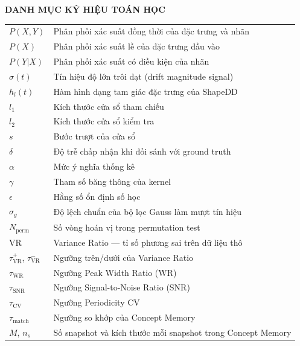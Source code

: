 \newpage
\pagestyle{fancy}

\setcounter{tocdepth}{0}

\begin{center}
    \Large \textbf{DANH MỤC KÝ HIỆU TOÁN HỌC}
\end{center}


\begin{table}[h]
\centering
\fontsize{13pt}{15pt}\selectfont
\begin{tabular}{ll}
$P(X, Y)$               & Phân phối xác suất đồng thời của đặc trưng và nhãn \\
$P(X)$                  & Phân phối xác suất lề của đặc trưng đầu vào        \\
$P(Y|X)$                & Phân phối xác suất có điều kiện của nhãn           \\
$\sigma(t)$             & Tín hiệu độ lớn trôi dạt (drift magnitude signal)  \\
$h_l(t)$                & Hàm hình dạng tam giác đặc trưng của ShapeDD       \\
$l_1$                   & Kích thước cửa sổ tham chiếu                       \\
$l_2$                   & Kích thước cửa sổ kiểm tra                         \\
$s$                     & Bước trượt của cửa sổ                              \\
$\delta$                & Độ trễ chấp nhận khi đối sánh với ground truth      \\
$\alpha$                & Mức ý nghĩa thống kê                               \\
$\gamma$                & Tham số băng thông của kernel                       \\
$\epsilon$              & Hằng số ổn định số học                              \\
$\sigma_g$              & Độ lệch chuẩn của bộ lọc Gauss làm mượt tín hiệu    \\
$N_{\text{perm}}$       & Số vòng hoán vị trong permutation test              \\
$\mathrm{VR}$           & Variance Ratio --- tỉ số phương sai trên dữ liệu thô \\
$\tau_{\mathrm{VR}}^{+}$, $\tau_{\mathrm{VR}}^{-}$ & Ngưỡng trên/dưới của Variance Ratio \\
$\tau_{\text{WR}}$      & Ngưỡng Peak Width Ratio (WR)                       \\
$\tau_{\text{SNR}}$     & Ngưỡng Signal-to-Noise Ratio (SNR)                 \\
$\tau_{\text{CV}}$      & Ngưỡng Periodicity CV                              \\
$\tau_{\text{match}}$   & Ngưỡng so khớp của Concept Memory                  \\
$M$, $n_s$              & Số snapshot và kích thước mỗi snapshot trong Concept Memory \\
\end{tabular}
\end{table}
